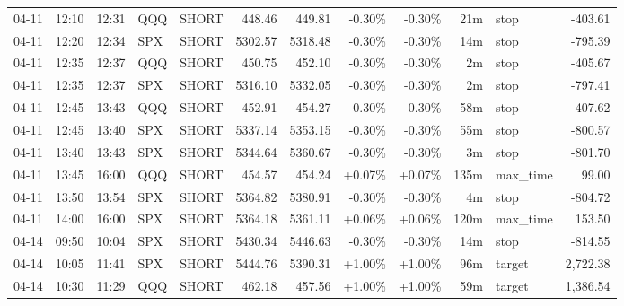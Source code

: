 \documentclass[11pt,a4paper]{article}
\begin{document}
\begin{center}
\begin{longtable}{>{\color{txtmain}}l l l l l r r r r r >{\color{txtmain}}l r}
04-11 & 12:10 & 12:31 & QQQ & SHORT & 448.46 & 449.81 & \textcolor{lossred}{-0.30\%} & \textcolor{lossred}{-0.30\%} & 21m & stop & \textcolor{lossred}{-403.61} \\
04-11 & 12:20 & 12:34 & SPX & SHORT & 5302.57 & 5318.48 & \textcolor{lossred}{-0.30\%} & \textcolor{lossred}{-0.30\%} & 14m & stop & \textcolor{lossred}{-795.39} \\
04-11 & 12:35 & 12:37 & QQQ & SHORT & 450.75 & 452.10 & \textcolor{lossred}{-0.30\%} & \textcolor{lossred}{-0.30\%} & 2m & stop & \textcolor{lossred}{-405.67} \\
04-11 & 12:35 & 12:37 & SPX & SHORT & 5316.10 & 5332.05 & \textcolor{lossred}{-0.30\%} & \textcolor{lossred}{-0.30\%} & 2m & stop & \textcolor{lossred}{-797.41} \\
04-11 & 12:45 & 13:43 & QQQ & SHORT & 452.91 & 454.27 & \textcolor{lossred}{-0.30\%} & \textcolor{lossred}{-0.30\%} & 58m & stop & \textcolor{lossred}{-407.62} \\
04-11 & 12:45 & 13:40 & SPX & SHORT & 5337.14 & 5353.15 & \textcolor{lossred}{-0.30\%} & \textcolor{lossred}{-0.30\%} & 55m & stop & \textcolor{lossred}{-800.57} \\
04-11 & 13:40 & 13:43 & SPX & SHORT & 5344.64 & 5360.67 & \textcolor{lossred}{-0.30\%} & \textcolor{lossred}{-0.30\%} & 3m & stop & \textcolor{lossred}{-801.70} \\
04-11 & 13:45 & 16:00 & QQQ & SHORT & 454.57 & 454.24 & \textcolor{wingreen}{+0.07\%} & \textcolor{wingreen}{+0.07\%} & 135m & max\_time & \textcolor{wingreen}{99.00} \\
04-11 & 13:50 & 13:54 & SPX & SHORT & 5364.82 & 5380.91 & \textcolor{lossred}{-0.30\%} & \textcolor{lossred}{-0.30\%} & 4m & stop & \textcolor{lossred}{-804.72} \\
04-11 & 14:00 & 16:00 & SPX & SHORT & 5364.18 & 5361.11 & \textcolor{wingreen}{+0.06\%} & \textcolor{wingreen}{+0.06\%} & 120m & max\_time & \textcolor{wingreen}{153.50} \\
04-14 & 09:50 & 10:04 & SPX & SHORT & 5430.34 & 5446.63 & \textcolor{lossred}{-0.30\%} & \textcolor{lossred}{-0.30\%} & 14m & stop & \textcolor{lossred}{-814.55} \\
04-14 & 10:05 & 11:41 & SPX & SHORT & 5444.76 & 5390.31 & \textcolor{wingreen}{+1.00\%} & \textcolor{wingreen}{+1.00\%} & 96m & target & \textcolor{wingreen}{2,722.38} \\
04-14 & 10:30 & 11:29 & QQQ & SHORT & 462.18 & 457.56 & \textcolor{wingreen}{+1.00\%} & \textcolor{wingreen}{+1.00\%} & 59m & target & \textcolor{wingreen}{1,386.54} \\

\end{longtable}
\end{center}
\end{document}
